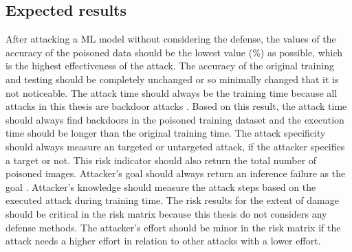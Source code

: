 \subsection{Expected results}

After attacking a ML model without considering the defense, the values of the accuracy of the poisoned data should be the lowest value (\%) as possible, which is the highest effectiveness of the attack. The accuracy of the original training and testing should be completely unchanged or so minimally changed that it is not noticeable. The attack time should always be the training time because all attacks in this thesis are backdoor attacks \cite{DBLP:journals/tr/UdeshiPWLRC22}. Based on this result, the attack time should always find backdoors in the poisoned training dataset and the execution time should be longer than the original training time. The attack specificity should always measure an targeted or untargeted attack, if the attacker specifies a target or not. This risk indicator should also return the total number of poisoned images. Attacker's goal should always return an inference failure as the goal \cite{DBLP:journals/corr/abs-2012-04884}. Attacker's knowledge should measure the attack steps based on the executed attack during training time. The risk results for the extent of damage should be critical in the risk matrix because this thesis do not considers any defense methods. The attacker's effort should be minor in the risk matrix if the attack needs a higher effort in relation to other attacks with a lower effort.
